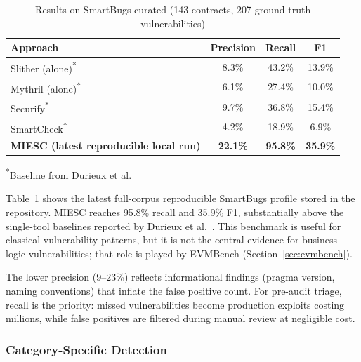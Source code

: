 \documentclass[conference]{IEEEtran}
\begin{document}
\begin{table}[htbp]
\caption{Results on SmartBugs-curated (143 contracts, 207 ground-truth vulnerabilities)}
\label{tab:smartbugs}
\centering
\begin{tabular}{@{}lccc@{}}
\toprule
\textbf{Approach} & \textbf{Precision} & \textbf{Recall} & \textbf{F1} \\
\midrule
Slither (alone)\textsuperscript{*} & 8.3\% & 43.2\% & 13.9\% \\
Mythril (alone)\textsuperscript{*} & 6.1\% & 27.4\% & 10.0\% \\
Securify\textsuperscript{*} & 9.7\% & 36.8\% & 15.4\% \\
SmartCheck\textsuperscript{*} & 4.2\% & 18.9\% & 6.9\% \\
\midrule
\textbf{MIESC (latest reproducible local run)} & \textbf{22.1\%} & \textbf{95.8\%} & \textbf{35.9\%} \\
\bottomrule
\end{tabular}

\vspace{2pt}
\footnotesize{\textsuperscript{*}Baseline from Durieux et al.~\cite{durieux2020empirical}}
\end{table}

Table~\ref{tab:smartbugs} shows the latest full-corpus reproducible SmartBugs profile stored in the repository. MIESC reaches 95.8\% recall and 35.9\% F1, substantially above the single-tool baselines reported by Durieux et al.~\cite{durieux2020empirical}. This benchmark is useful for classical vulnerability patterns, but it is not the central evidence for business-logic vulnerabilities; that role is played by EVMBench (Section~\ref{sec:evmbench}).

The lower precision (9--23\%) reflects informational findings (pragma version, naming conventions) that inflate the false positive count. For pre-audit triage, recall is the priority: missed vulnerabilities become production exploits costing millions, while false positives are filtered during manual review at negligible cost.

\subsubsection{Category-Specific Detection}
\end{document}
